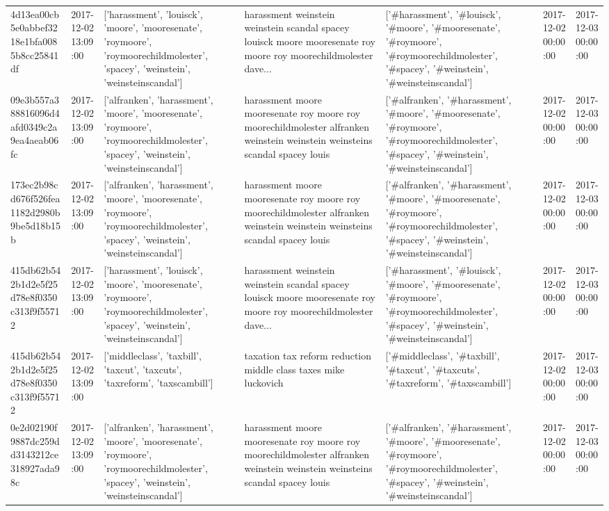 \begin{tabular}{lllllll}
4d13ea00cb5e0abbef3218e1bfa0085b8cc25841df & 2017-12-02 13:09:00 & ['harassment', 'louisck', 'moore', 'mooresenate', 'roymoore', 'roymoorechildmolester', 'spacey', 'weinstein', 'weinsteinscandal'] & harassment weinstein weinstein scandal spacey louisck moore mooresenate roy moore roy moorechildmolester dave... & ['#harassment', '#louisck', '#moore', '#mooresenate', '#roymoore', '#roymoorechildmolester', '#spacey', '#weinstein', '#weinsteinscandal'] & 2017-12-02 00:00:00 & 2017-12-03 00:00:00 \\
09e3b557a388816096d4afd0349c2a9ea4aeab06fc & 2017-12-02 13:09:00 & ['alfranken', 'harassment', 'moore', 'mooresenate', 'roymoore', 'roymoorechildmolester', 'spacey', 'weinstein', 'weinsteinscandal'] & harassment moore mooresenate roy moore roy moorechildmolester alfranken weinstein weinstein weinsteins scandal spacey louis & ['#alfranken', '#harassment', '#moore', '#mooresenate', '#roymoore', '#roymoorechildmolester', '#spacey', '#weinstein', '#weinsteinscandal'] & 2017-12-02 00:00:00 & 2017-12-03 00:00:00 \\
173ec2b98cd676f526fea1182d2980b9be5d18b15b & 2017-12-02 13:09:00 & ['alfranken', 'harassment', 'moore', 'mooresenate', 'roymoore', 'roymoorechildmolester', 'spacey', 'weinstein', 'weinsteinscandal'] & harassment moore mooresenate roy moore roy moorechildmolester alfranken weinstein weinstein weinsteins scandal spacey louis & ['#alfranken', '#harassment', '#moore', '#mooresenate', '#roymoore', '#roymoorechildmolester', '#spacey', '#weinstein', '#weinsteinscandal'] & 2017-12-02 00:00:00 & 2017-12-03 00:00:00 \\
415db62b542b1d2e5f25d78e8f0350c313f9f55712 & 2017-12-02 13:09:00 & ['harassment', 'louisck', 'moore', 'mooresenate', 'roymoore', 'roymoorechildmolester', 'spacey', 'weinstein', 'weinsteinscandal'] & harassment weinstein weinstein scandal spacey louisck moore mooresenate roy moore roy moorechildmolester dave... & ['#harassment', '#louisck', '#moore', '#mooresenate', '#roymoore', '#roymoorechildmolester', '#spacey', '#weinstein', '#weinsteinscandal'] & 2017-12-02 00:00:00 & 2017-12-03 00:00:00 \\
415db62b542b1d2e5f25d78e8f0350c313f9f55712 & 2017-12-02 13:09:00 & ['middleclass', 'taxbill', 'taxcut', 'taxcuts', 'taxreform', 'taxscambill'] & taxation tax reform reduction middle class taxes mike luckovich & ['#middleclass', '#taxbill', '#taxcut', '#taxcuts', '#taxreform', '#taxscambill'] & 2017-12-02 00:00:00 & 2017-12-03 00:00:00 \\
0e2d02190f9887dc259dd3143212ce318927ada98c & 2017-12-02 13:09:00 & ['alfranken', 'harassment', 'moore', 'mooresenate', 'roymoore', 'roymoorechildmolester', 'spacey', 'weinstein', 'weinsteinscandal'] & harassment moore mooresenate roy moore roy moorechildmolester alfranken weinstein weinstein weinsteins scandal spacey louis & ['#alfranken', '#harassment', '#moore', '#mooresenate', '#roymoore', '#roymoorechildmolester', '#spacey', '#weinstein', '#weinsteinscandal'] & 2017-12-02 00:00:00 & 2017-12-03 00:00:00 \\

\end{tabular}
